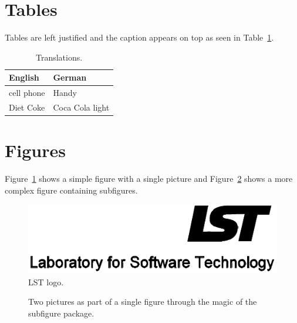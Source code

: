 \documentclass[11pt,a4paper]{book}
\begin{document}
\section{Tables}

Tables are left justified and the caption appears on top as seen in
Table~\ref{t:Translations}.

\begin{table}[ht]
\centering
\begin{tabular}{ll}
\hline
\textbf{English} & \textbf{German}\\
\hline
cell phone       & Handy\\
Diet Coke        & Coca Cola light\\
\hline
\end{tabular}
\caption[Translations]{\label{t:Translations}Translations.}
\end{table}

\section{Figures}

Figure~\ref{f:IRISlogo} shows a simple figure with a single picture
and Figure~\ref{f:SubfigureExample} shows a more complex figure
containing subfigures.

\begin{figure}[ht]
\centering
\includegraphics[width=.6\linewidth]{figures/LSTlogo}
\caption[LST logo]{\label{f:IRISlogo}LST logo.}
\end{figure}

\begin{figure}[ht]
\centering
{}\quad
{}
\caption[Subfigure example]{\label{f:SubfigureExample}Two pictures as
  part of a single figure through the magic of the subfigure package.}
\end{figure}
\end{document}
